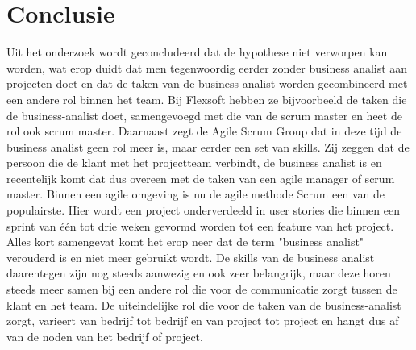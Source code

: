 \documentclass{hogent-article}
\begin{document}
	\section{Conclusie}
	Uit het onderzoek wordt geconcludeerd dat de hypothese niet verworpen kan worden, wat erop duidt dat men tegenwoordig eerder zonder business analist aan projecten doet en dat de taken van de business analist worden gecombineerd met een andere rol binnen het team.\newline \newline
	Bij Flexsoft hebben ze bijvoorbeeld de taken die de business-analist doet, samengevoegd met die van de scrum master en heet de rol ook scrum master. \newline
	Daarnaast zegt de Agile Scrum Group dat in deze tijd de business analist geen rol meer is, maar eerder een set van skills. Zij zeggen dat de persoon die de klant met het projectteam verbindt, de business analist is en recentelijk komt dat dus overeen met de taken van een agile manager of scrum master. \newline \newline
	Binnen een agile omgeving is nu de agile methode Scrum een van de populairste. Hier wordt een project onderverdeeld in user stories die binnen een sprint van één tot drie weken gevormd worden tot een feature van het project. \newline \newline
	Alles kort samengevat komt het erop neer dat de term "business analist" verouderd is en niet meer gebruikt wordt. De skills van de business analist daarentegen zijn nog steeds aanwezig en ook zeer belangrijk, maar deze horen steeds meer samen bij een andere rol die voor de communicatie zorgt tussen de klant en het team. De uiteindelijke rol die voor de taken van de business-analist zorgt, varieert van bedrijf tot bedrijf en van project tot project en hangt dus af van de noden van het bedrijf of project.
	
	
	
	\printbibliography
	
\end{document}
